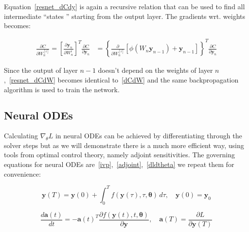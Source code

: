 \documentclass[11pt]{article}
\begin{document}
    Equation~\eqref{resnet_dCdy} is again a recursive relation that can be used to find all intermediate ``states '' starting from the output layer.
    The gradients wrt.
    weights becomes:

    \begin{align}
        \frac{ \partial C}{\partial W_n^{[i]} }
        =
        \left[ \frac{ \partial \pmb{y}_{n}}{\partial W_n^i } \right]^T
        \frac{ \partial C}{\partial \pmb{y}_{n} }
        &=
        \left\{
        \frac{ \partial }{\partial W_n^{[i]} }
        \left[
            \phi( W_{n} \bm{y}_{n-1} )  + \textbf{y}_{n-1}
            \right]
        \right\}^T
        \frac{ \partial C}{\partial \pmb{y}_{n} }
        \label{resnet_dCdW}
    \end{align}

    Since the output of layer $n-1$ doesn't depend on the weights of layer $n$,~\eqref{resnet_dCdW} becomes identical to~\eqref{dCdW} and the same backpropagation algorithm is used to train the network.


    \subsection{Neural ODEs}
    Calculating $\nabla_{\theta}L$ in neural ODEs can be achieved by differentiating through the solver steps but as we will demonstrate there is a much more efficient way, using tools from optimal control theory, namely adjoint sensitivities.
    The governing equations for neural ODEs are~\eqref{ivp},~\eqref{adjoint},~\eqref{dldtheta} we repeat them for convenience:

    \begin{equation*}
        \pmb{y}(T) =  \pmb{y}(0) +\int_{0}^{T} f(\pmb{y}(\tau), \tau, \pmb{\theta}) \,d\tau
        , \quad
        \pmb{y}(0) = \pmb{y}_0
    \end{equation*}

    \begin{equation*}
        \frac
        {d \pmb{a}(t)}
        {dt}
        =
        - \pmb{a}(t)^T
        \frac
        {\partial f( \pmb{y}(t), t, \pmb{\theta} )}
        {\partial \pmb{y} }
        , \quad
        \pmb{a}(T) = \frac{\partial L}{\partial \pmb{y}(T)}
    \end{equation*}
\end{document}
